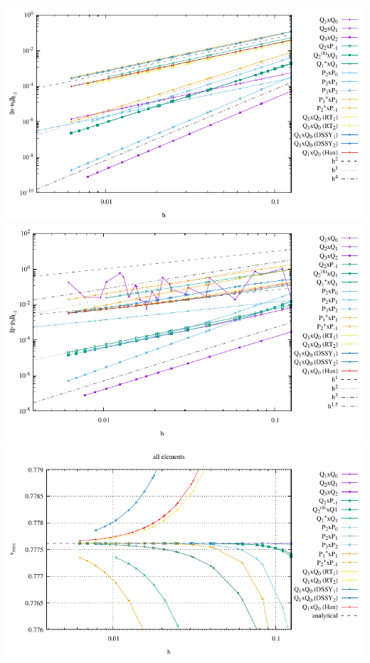 \begin{center}
\includegraphics[width=13.5cm]{python_codes/fieldstone_120/results/errors-velocity-all}\\
\includegraphics[width=13.5cm]{python_codes/fieldstone_120/results/errors-pressure-all}\\
\includegraphics[width=13.5cm]{python_codes/fieldstone_120/results/vrms_zoom}
\end{center}


